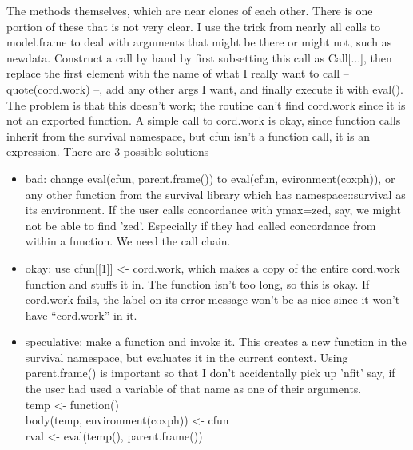 \documentclass{article}
\begin{document}
The methods themselves, which are near clones of each other.
There is one portion of these that is not very clear.  
I use the trick from nearly all calls to model.frame to deal with 
arguments that might be there or might not, such as newdata.
Construct a call by hand by first subsetting this call as Call[...],
then replace the first element with the name of what I really want
to call -- quote(cord.work) --, add any other args I want, and finally
execute it with eval().
The problem is that this doesn't work; the routine can't find cord.work
since it is not an exported function.  A simple call to cord.work is
okay, since function calls inherit from the survival namespace, but
cfun isn't a function call, it is an expression.  
There are 3 possible solutions
\begin{itemize}
  \item bad: change eval(cfun, parent.frame()) to eval(cfun, evironment(coxph)),
    or any other function from the survival library which has 
    namespace::survival as its environment.  If the user calls concordance
    with ymax=zed, say, we might not be able to find 'zed'.  Especially if they
    had called concordance from within a function.  We need the call chain.
  \item okay: use cfun[[1]] <- cord.work, which makes a copy of the entire
    cord.work function and stuffs it in.  The function isn't too long, so this
    is okay.  If cord.work fails, the label on its error message won't be as
    nice since it won't have ``cord.work'' in it. 
  \item speculative: make a function and invoke it.
    This creates a new function in the survival namespace, but evaluates it
    in the current context.  Using parent.frame() is important so that I
    don't accidentally pick up 'nfit' say, if the user had used a variable of
    that name as one of their arguments. \\
    temp <- function(){} \\
    body(temp, environment(coxph)) <- cfun\\
    rval <- eval(temp(), parent.frame()) 
\end{itemize}
\end{document}
